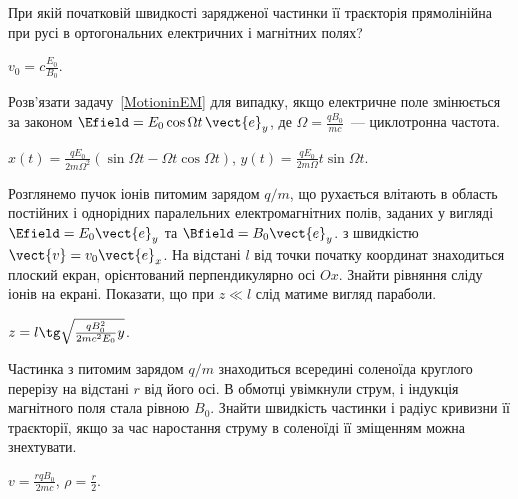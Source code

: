 \begin{problem}
При якій початковій швидкості зарядженої частинки її траєкторія прямолінійна при русі в ортогональних електричних і магнітних полях?
\begin{solution}
	$v_0 = c\frac{E_0}{B_0}$.
\end{solution}
\end{problem}


\begin{problem}
Розв'язати задачу~\ref{MotioninEM} для випадку, якщо електричне поле змінюється за законом $\Efield = E_0\cos\Omega t\,\vect{e}_y$,  де $\Omega = \frac{qB_0}{mc}$~--- циклотронна частота.
\begin{solution}
	$x(t)  = \frac{qE_0}{2m\Omega^2}\left( \sin\Omega t - \Omega t\cos\Omega t \right) $,
	$y(t)  = \frac{qE_0}{2m\Omega}t\sin\Omega t$.
\end{solution}
\end{problem}


\begin{problem}
Розглянемо пучок іонів питомим зарядом $q/m$, що рухається влітають в область постійних і однорідних паралельних електромагнітних полів, заданих у вигляді $\Efield = E_0\vect{e}_y$ та $\Bfield = B_0\vect{e}_y$. з швидкістю $\vect{v} = v_0 \vect{e}_x$. На відстані $l$ від точки початку координат знаходиться плоский екран, орієнтований перпендикулярно осі $Ox$. Знайти рівняння сліду іонів на екрані. Показати, що при $z \ll l$ слід матиме вигляд параболи.
\begin{solution}
	$z = l\tg\sqrt{\frac{qB_0^2}{2mc^2E_0}y}$.
\end{solution}
\end{problem}


\begin{problem}
Частинка з питомим зарядом $q/m$ знаходиться всередині соленоїда круглого перерізу на відстані $r$ від його осі. В обмотці увімкнули струм, і індукція магнітного поля стала рівною $B_0$. Знайти швидкість частинки і радіус кривизни її траєкторії, якщо за час наростання струму в соленоїді її зміщенням можна знехтувати.
\begin{solution}
	$v = \frac{rqB_0}{2mc}$, $\rho = \frac{r}{2}$.
\end{solution}
\end{problem}

